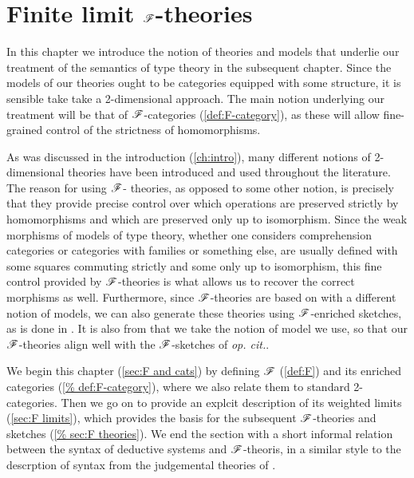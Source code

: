 \documentclass[../thesis.tex]{subfiles}
\begin{document}
\chapter{Finite limit \texorpdfstring{${\mathscr{F}}$}{F}-theories}\label{ch:F-theories}
In this chapter we introduce the notion of theories and models that underlie our treatment of
the semantics of type theory in the subsequent chapter. Since the models of our theories ought
to be categories equipped with some structure, it is sensible take take a 2-dimensional approach.
The main notion underlying our treatment will be that of ${\mathscr{F}}$-categories (\cref{def:F-category}),
as these will allow fine-grained control of the strictness of homomorphisms.

As was discussed in the introduction (\cref{ch:intro}), many different notions of 2-dimensional
theories have been introduced and used throughout the literature. The reason for using ${\mathscr{F}}$-%
theories, as opposed to some other notion, is precisely that they provide precise control over
which operations are preserved strictly by homomorphisms and which are preserved only up to
isomorphism. Since the weak morphisms of models of type theory, whether one considers comprehension
categories or categories with families or something else, are usually defined with some squares
commuting strictly and some only up to isomorphism, this fine control provided by ${\mathscr{F}}$-theories
is what allows us to recover the correct morphisms as well. Furthermore, since ${\mathscr{F}}$-theories
are based on \cite{kelly1982a} with a different notion of models, we can also generate these
theories using ${\mathscr{F}}$-enriched sketches, as is done in \cite{arkor2024}. It is also from \cite{
arkor2024} that we take the notion of model we use, so that our ${\mathscr{F}}$-theories align well with
the ${\mathscr{F}}$-sketches of \emph{op. cit.}.

We begin this chapter (\cref{sec:F and cats}) by defining ${\mathscr{F}}$ (\cref{def:F}) and its enriched categories (\cref{%
def:F-category}), where we also relate them to standard 2-categories. Then we go on to provide an explcit description of
its weighted limits (\cref{sec:F limits}), which provides the basis for the subsequent ${\mathscr{F}}$-theories and sketches (\cref{%
sec:F theories}). We end the section with a short informal relation between the syntax of deductive systems and ${\mathscr{F}}$-theoris,
in a similar style to the descrption of syntax from the judgemental theories of \cite{coraglia2024a}.
\end{document}
